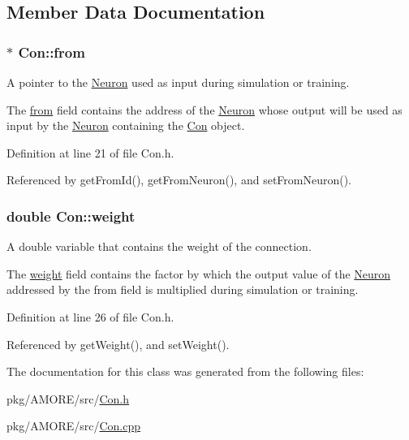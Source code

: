 \subsection{Member Data Documentation}
\hypertarget{class_con_a40215fdb25f3b2ed66e965df558e86e2}{
\subsubsection[{from}]{$\ast$ {\bf Con::from}}}
\label{class_con_a40215fdb25f3b2ed66e965df558e86e2}


A pointer to the \hyperlink{class_neuron}{Neuron} used as input during simulation or training. 

The \hyperlink{class_con_a40215fdb25f3b2ed66e965df558e86e2}{from} field contains the address of the \hyperlink{class_neuron}{Neuron} whose output will be used as input by the \hyperlink{class_neuron}{Neuron} containing the \hyperlink{class_con}{Con} object. 

Definition at line 21 of file Con.h.



Referenced by getFromId(), getFromNeuron(), and setFromNeuron().

\hypertarget{class_con_a7f46485ba5b41971ea38641f9e7d1be0}{
\subsubsection[{weight}]{\setlength{\rightskip}{0pt plus 5cm}double {\bf Con::weight}}}
\label{class_con_a7f46485ba5b41971ea38641f9e7d1be0}


A double variable that contains the weight of the connection. 

The \hyperlink{class_con_a7f46485ba5b41971ea38641f9e7d1be0}{weight} field contains the factor by which the output value of the \hyperlink{class_neuron}{Neuron} addressed by the from field is multiplied during simulation or training. 

Definition at line 26 of file Con.h.



Referenced by getWeight(), and setWeight().



The documentation for this class was generated from the following files:\begin{DoxyCompactItemize}
\item 
pkg/AMORE/src/\hyperlink{_con_8h}{Con.h}\item 
pkg/AMORE/src/\hyperlink{_con_8cpp}{Con.cpp}\end{DoxyCompactItemize}
